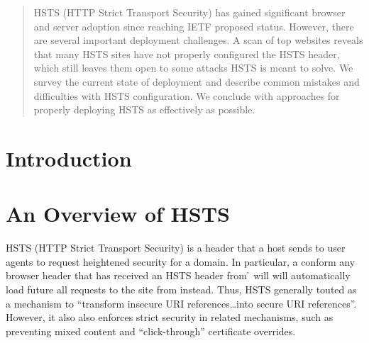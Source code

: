 \documentclass{acm_proc_article-sp}
\begin{document}
\date{October 08, 2013}

\maketitle
\begin{abstract}
HSTS (HTTP Strict Transport Security) has gained significant browser and server adoption since reaching IETF proposed status. However, there are several important deployment challenges. A scan of top websites reveals that many HSTS sites have not properly configured the HSTS header, which still leaves them open to some attacks HSTS is meant to solve. We survey the current state of deployment and describe common mistakes and difficulties with HSTS configuration. We conclude with approaches for properly deploying HSTS as effectively as possible.\end{abstract}





\section{Introduction}
\label{sec:intro}

\cite{coderrr-blog}
\cite{tack}

\section{An Overview of HSTS}

HSTS (HTTP Strict Transport Security) is a header that a host sends to user agents to request heightened security for a domain. In particular, a conform any browser header that has received an HSTS header from {\h} will will automatically load future all requests to the site from {\s} instead. Thus, HSTS generally touted as a mechanism to ``transform insecure URI references\ldots into secure URI references''. However, it also also enforces strict security in related mechanisms, such as preventing mixed content and ``click-through'' certificate overrides\cite{rfc}.
\end{document}
